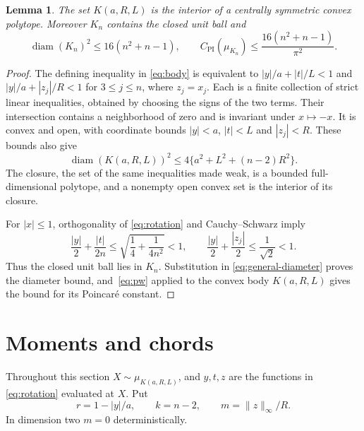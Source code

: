 \documentclass[11pt]{amsart}
\newtheorem{lemma}[theorem]{Lemma}
\theoremstyle{remark}
\numberwithin{equation}{section}
\newcommand{\diam}{\operatorname{diam}}
\newcommand{\CPI}{C_{\mathrm{PI}}}
\begin{document}
\begin{lemma}\label{lem:geometry}
The set $K(a,R,L)$ is the interior of a centrally symmetric convex
polytope. Moreover $K_n$ contains the closed unit ball and
\begin{equation}\label{eq:diameter}
 \diam(K_n)^2\le16(n^2+n-1),\qquad
 \CPI(\mu_{K_n})\le\frac{16(n^2+n-1)}{\pi^2}.
\end{equation}
\end{lemma}
\begin{proof}
The defining inequality in \eqref{eq:body} is equivalent to
$|y|/a+|t|/L<1$ and $|y|/a+|z_j|/R<1$ for $3\le j\le n$, where $z_j=x_j$.
Each is a finite collection of strict linear inequalities, obtained by
choosing the signs of the two terms. Their intersection contains a
neighborhood of zero and is invariant under $x\mapsto-x$.
It is convex and open, with coordinate bounds
$|y|<a$, $|t|<L$ and $|z_j|<R$. These bounds also give
\begin{equation}\label{eq:general-diameter}
 \diam(K(a,R,L))^2\le4\{a^2+L^2+(n-2)R^2\}.
\end{equation}
The closure, the set of the same inequalities made weak, is a bounded full-dimensional polytope, and a nonempty open convex set is the interior of its closure.

For $|x|\le1$, orthogonality of \eqref{eq:rotation} and
Cauchy--Schwarz imply
\[
 \frac{|y|}{2}+\frac{|t|}{2n}
 \le\sqrt{\frac14+\frac{1}{4n^2}}<1,
 \qquad
 \frac{|y|}{2}+\frac{|z_j|}{2}\le\frac1{\sqrt2}<1.
\]
Thus the closed unit ball lies in $K_n$.
Substitution in \eqref{eq:general-diameter} proves the diameter bound, and~\eqref{eq:pw}
applied to the convex body $K(a,R,L)$ gives the bound for its Poincar\'e constant.
\end{proof}

\section{Moments and chords}\label{sec:moments}
Throughout this section $X\sim\mu_{K(a,R,L)}$, and $y,t,z$ are the
functions in \eqref{eq:rotation} evaluated at $X$. Put
\begin{equation}\label{eq:slacks}
 r=1-|y|/a,\qquad k=n-2,\qquad m=\|z\|_\infty/R.
\end{equation}
In dimension two $m=0$ deterministically.
\end{document}
